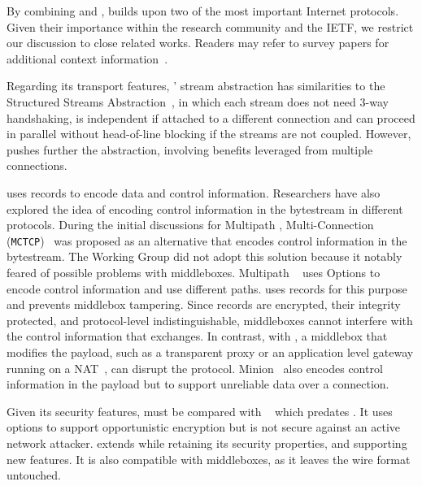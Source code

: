 
By combining \tcp and \tls, \tcpls builds upon two of the most important
Internet protocols. Given their importance within  the research community and the IETF, we restrict our discussion to close related works. Readers may refer to survey papers for additional  context
information~\cite{polese2019survey,li2016multipath,papastergiou2016ossifying}.

Regarding its transport features, \tcpls' stream abstraction has similarities to
the Structured Streams Abstraction~\cite{ford2007structured}, in which each
stream does not need 3-way handshaking, is independent if attached to a
different \tcp connection and can proceed in parallel without head-of-line
blocking if the streams are not coupled. However, \tcpls pushes further the
abstraction, involving benefits leveraged from multiple connections.

\tcpls uses \tls records to encode data and control information. Researchers
have also explored the idea of encoding control information in the \tcp
bytestream in different protocols. During the initial discussions for Multipath \tcp, Multi-Connection \tcp (\texttt{MCTCP})~\cite{draft-scharf-mptcp-mctcp-01}
was proposed as an alternative that encodes control information in the bytestream. The \mptcp Working Group did not adopt this solution because it notably feared of possible problems with middleboxes. Multipath \tcp~\cite{raiciu2012hard,rfc8684} uses \tcp Options to encode control information and use different paths. \tcpls uses \tls records for this purpose and prevents middlebox tampering. Since \tls records are encrypted, their integrity protected, and protocol-level indistinguishable, middleboxes cannot interfere with the control information that \tcpls exchanges. In contrast, with \mptcp, a middlebox that modifies the payload, such as a transparent \tcp proxy or an application level gateway running on a NAT~\cite{rfc3027}, can disrupt the
protocol. Minion~\cite{nowlan2012fitting} also encodes control information in
the \tcp payload but to support unreliable data over a connection.

Given its security features, \tcpls must be compared with
\tcpcrypt~\cite{bittau2010case,rfc8548} which predates . It uses \tcp
options to support opportunistic encryption but is not secure against an active
network attacker. \tcpls extends \tls while retaining its security  properties, and supporting new features. It is also compatible with \tcp  middleboxes, as it leaves the \tcp wire format untouched.

